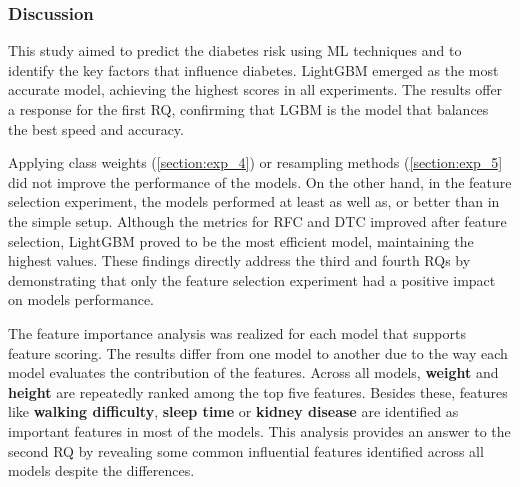 \documentclass[runningheads]{llncs}
\begin{document}
\subsubsection{Discussion}
This study aimed to predict the diabetes risk using ML techniques and to identify the key factors that influence diabetes. LightGBM emerged as the most accurate model, achieving the highest scores in all experiments. The results offer a response for the first RQ, confirming that LGBM is the model that balances the best speed and accuracy. 

Applying class weights (\autoref{section:exp_4}) or resampling methods (\autoref{section:exp_5} did not improve the performance of the models. On the other hand, in the feature selection experiment, the models performed at least as well as, or better than in the simple setup. Although the metrics for RFC and DTC improved after feature selection, LightGBM proved to be the most efficient model, maintaining the highest values. These findings directly address the third and fourth RQs by demonstrating that only the feature selection experiment had a positive impact on models performance.

The feature importance analysis was realized for each model that supports feature scoring. The results differ from one model to another due to the way each model evaluates the contribution of the features. Across all models, \textbf{weight} and \textbf{height} are repeatedly ranked among the top five features. Besides these, features like \textbf{walking difficulty}, \textbf{sleep time} or \textbf{kidney disease} are identified as important features in most of the models. This analysis provides an answer to the second RQ by revealing some common influential features identified across all models despite the differences. 
\end{document}
